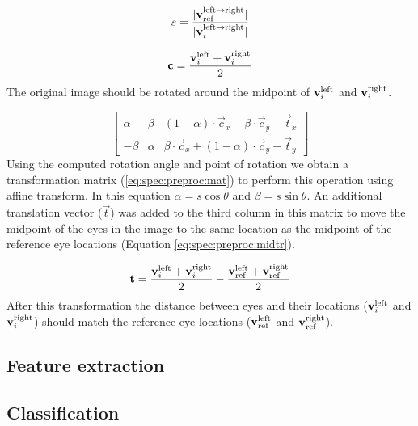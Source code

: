 \begin{equation}
    \label{eq:spec:preproc:scales}
    s = \frac{|\mathbf{v}_{\text{ref}}^{\text{left} \rightarrow \text{right}}|}{|\mathbf{v}_i^{\text{left} \rightarrow \text{right}}|}
\end{equation}

\begin{equation}
    \label{eq:spec:preproc:centre}
    \mathbf{c} = \frac{\mathbf{v}_i^{\text{left}} + \mathbf{v}_i^{\text{right}}}{2}
\end{equation}
The original image should be rotated around the midpoint of $\mathbf{v}_i^{\text{left}}$ and
$\mathbf{v}_i^{\text{right}}$.

\begin{equation}
    \label{eq:spec:preproc:mat}
    \begin{bmatrix}
    \alpha & \beta  & (1-\alpha)\cdot \vec{c}_x - \beta \cdot \vec{c}_y + \vec{t}_x \\
    -\beta & \alpha & \beta \cdot \vec{c}_x + (1-\alpha)\cdot \vec{c}_y + \vec{t}_y
    \end{bmatrix}
\end{equation}
Using the computed rotation angle and point of rotation we obtain a
transformation matrix (\ref{eq:spec:preproc:mat}) to perform this operation
using affine transform. In this equation $\alpha = s\cos\theta$ and $\beta =
s\sin\theta$. An additional translation vector ($\vec{t}$) was added to the
third column in this matrix to move the midpoint of the eyes in the image to
the same location as the midpoint of the reference eye locations (Equation
\ref{eq:spec:preproc:midtr}). 

\begin{equation}
    \label{eq:spec:preproc:midtr}
    \mathbf{t} = \frac{\mathbf{v}_i^{\text{left}} + \mathbf{v}_i^{\text{right}}}{2} - \frac{\mathbf{v}_{\text{ref}}^{\text{left}} + \mathbf{v}_{\text{ref}}^{\text{right}}}{2}
\end{equation}
After this transformation the distance between eyes and their locations
($\mathbf{v}_i^{\text{left}}$ and $\mathbf{v}_i^{\text{right}}$) should match the reference eye locations
($\mathbf{v}_{\text{ref}}^{\text{left}}$ and $\mathbf{v}_{\text{ref}}^{\text{right}}$).


\subsection{Feature extraction}


\subsection{Classification}


